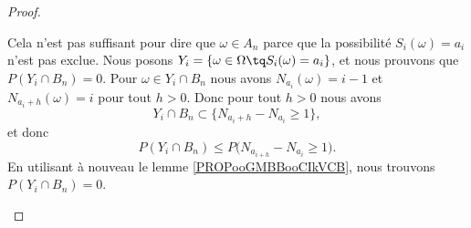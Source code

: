 \begin{proof}
\begin{subproof}
        Cela n'est pas suffisant pour dire que \( \omega\in A_n\) parce que la possibilité \( S_i(\omega)=a_i\) n'est pas exclue.
        Nous posons \( Y_i=\{ \omega\in \Omega\tq S_i(\omega)=a_i \}\), et nous prouvons que \( P(Y_i\cap B_n)=0\). Pour \( \omega\in Y_i\cap B_n\) nous avons \( N_{a_i}(\omega)=i-1\) et \( N_{a_i+h}(\omega)=i\) pour tout \( h>0\). Donc pour tout \( h>0\) nous avons
        \begin{equation}
            Y_i\cap B_n\subset\{ N_{a_i+h}-N_{a_i}\geq 1 \}, 
        \end{equation}
        et donc
        \begin{equation}
            P(Y_i\cap B_n)\leq P\big( N_{a_{i+h}}-N_{a_i}\geq 1 \big).
        \end{equation}
        En utilisant à nouveau le lemme \ref{PROPooGMBBooCIkVCB}, nous trouvons \( P(Y_i\cap B_n)=0\).


\end{subproof}
\end{proof}
